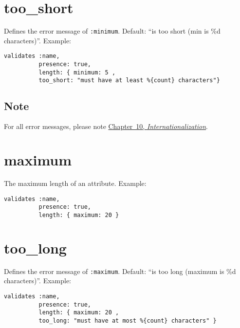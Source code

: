 \documentclass[a4paper]{book}
\begin{document}
\section{too\_short}\label{tooux5fshort}

Defines the error message of \texttt{:minimum}. Default: “is too short (min is \%d characters)”. Example:

\begin{shaded}\begin{verbatim}
validates :name,
          presence: true,
          length: { minimum: 5 ,
          too_short: "must have at least %{count} characters"}
\end{verbatim}\end{shaded}

\subsection{Note}\label{note-27}

For all error messages, please note \hyperref[i18n]{Chapter~10, \emph{Internationalization}}.

\section{maximum}\label{maximum-1}

The maximum length of an attribute. Example:

\begin{shaded}\begin{verbatim}
validates :name,
          presence: true,
          length: { maximum: 20 }
\end{verbatim}\end{shaded}

\section{too\_long}\label{tooux5flong}

Defines the error message of \texttt{:maximum}. Default: “is too long (maximum is \%d characters)”. Example:

\begin{shaded}\begin{verbatim}
validates :name,
          presence: true,
          length: { maximum: 20 ,
          too_long: "must have at most %{count} characters" }
\end{verbatim}\end{shaded}
\end{document}
